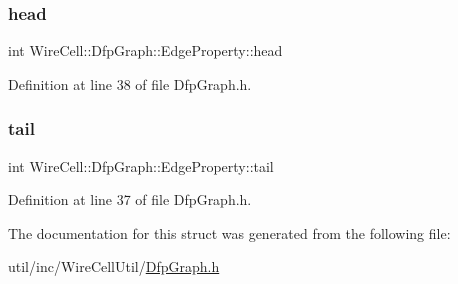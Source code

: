 \subsubsection{\texorpdfstring{head}{head}}
{\footnotesize\ttfamily int Wire\+Cell\+::\+Dfp\+Graph\+::\+Edge\+Property\+::head}



Definition at line 38 of file Dfp\+Graph.\+h.

\mbox{\label{struct_wire_cell_1_1_dfp_graph_1_1_edge_property_abdc33a0dad8cc99591a0b257836c5258}} 
\subsubsection{\texorpdfstring{tail}{tail}}
{\footnotesize\ttfamily int Wire\+Cell\+::\+Dfp\+Graph\+::\+Edge\+Property\+::tail}



Definition at line 37 of file Dfp\+Graph.\+h.



The documentation for this struct was generated from the following file\+:\begin{DoxyCompactItemize}
\item 
util/inc/\+Wire\+Cell\+Util/\hyperlink{_dfp_graph_8h}{Dfp\+Graph.\+h}\end{DoxyCompactItemize}
